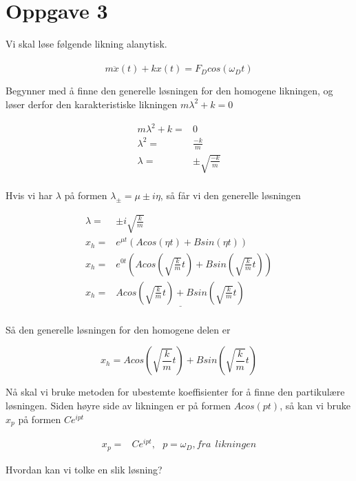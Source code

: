 \documentclass[norsk,a4paper,12pt]{article}
\begin{document}
\section*{Oppgave 3}

Vi skal løse følgende likning alanytisk.
\\
\\
\begin{equation}
	m \ddot{x}(t) +kx(t) = F_D cos(\omega_Dt)
\end{equation}

Begynner med å finne den generelle løsningen for den homogene likningen, og løser derfor den karakteristiske likningen $m\lambda^2 + k = 0$

\begin{align*}
	m\lambda^2 + k =& 0 \\
	\lambda^2 =& \frac{-k}{m} \\
	\lambda =& \pm \sqrt{\frac{-k}{m}}\\
\end{align*}

Hvis vi har $\lambda$ på formen $\lambda_{\pm} = \mu \pm i\eta$, så får vi den generelle løsningen

\begin{align*}
	\lambda =& \pm i \sqrt{\frac{k}{m}}\\
	x_h =& e^{\mu t}(A cos(\eta t) + B sin(\eta t))\\
	x_h =& e^{0t}(A cos(\sqrt{\frac{k}{m}}t) +B sin(\sqrt{\frac{k}{m}}t))\\
	x_h =& \underline{A cos(\sqrt{\frac{k}{m}}t) +B sin(\sqrt{\frac{k}{m}}t)}\\
\end{align*}

Så den generelle løsningen for den homogene delen er

\begin{equation}
	x_h = A cos(\sqrt{\frac{k}{m}}t) +B sin(\sqrt{\frac{k}{m}}t)
\end{equation}


Nå skal vi bruke metoden for ubestemte koeffisienter for å finne den partikulære løsningen. Siden høyre side av likningen er på formen $A cos(pt)$, så kan vi bruke $x_p$ på formen $C e^{ipt}$

\begin{align*}
	x_p =& C e^{ipt},\   \   \ p=\omega_D, fra\ \ likningen
\end{align*}

Hvordan kan vi tolke en slik løsning?
\\
\\
\end{document}
